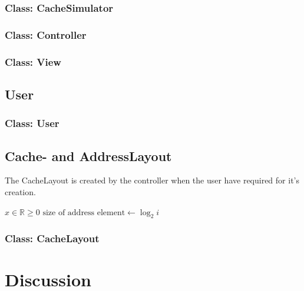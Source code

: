 \documentclass[a4paper]{scrreprt}
\begin{document}
\subsection{Class: CacheSimulator}
\label{subsec:cachesimulator.java}


\subsection{Class: Controller}
\label{subsec:controller.java}


\subsection{Class: View}
\label{subsec:view.java}


\section{User}
\label{sec:user}

\subsection{Class: User}
\label{subsec:user.java}


\section{Cache- and AddressLayout}
\label{sec:cache}

The CacheLayout is created by the controller when the user have required for it's creation.

\begin{algorithmic}
\State $x \in \mathbb{R} \geq 0$ 
    \State $\text{size of address element} \gets \log _2 i$ 
\EndIf
\end{algorithmic}

\subsection{Class: CacheLayout}
\label{subsec:cachelayout.java}



\chapter{Discussion}
\end{document}
